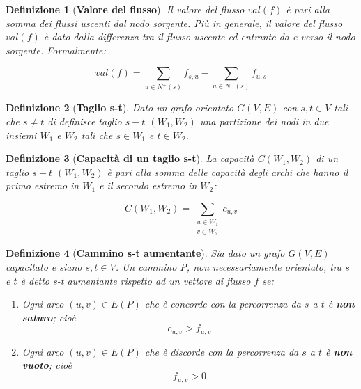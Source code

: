 \documentclass[10pt,a4paper,titlepage]{article}
\theoremstyle{break}
\newtheorem{myDef}{Definizione}
\theoremstyle{break}
\theoremstyle{break}
\begin{document}
\begin{myDef}[\textbf{Valore del flusso}]
Il valore del flusso $val(f)$ è pari alla \textit{somma dei flussi uscenti dal nodo sorgente}. Più in generale, il valore del flusso $val(f)$ è dato dalla differenza tra il flusso uscente ed entrante da e verso il nodo sorgente. Formalmente:

\begin{equation}
val(f) = \sum_{u \in N^+(s)} f_{s,u} - \sum_{u \in N^-(s)} f_{u,s}
\end{equation}

\end{myDef}

\begin{myDef}[\textbf{Taglio s-t}]
Dato un grafo orientato $G(V,E)$ con $s, t \in V$ tali che $s \neq t$ di definisce \textit{taglio $s-t$} $(W_1, W_2)$ una partizione dei nodi in due insiemi $W_1$ e $W_2$ tali che $s \in W_1$ e $t \in W_2$. 
\end{myDef}

\begin{myDef}[\textbf{Capacità di un taglio s-t}]
La \textit{capacità} $C(W_1, W_2)$ di un taglio $s-t$ $(W_1, W_2)$ è pari alla somma delle capacità degli archi che hanno il primo estremo in $W_1$ e il secondo estremo in $W_2$:

\begin{equation}
C(W_1, W_2) = \sum_{\begin{array}{ll} u \in W_1 \\ v \in W_2 \end{array}} c_{u,v}
\end{equation}

\end{myDef}

\begin{myDef}[\textbf{Cammino s-t aumentante}]

Sia dato un grafo $G(V,E)$ capacitato e siano $s, t \in V$. Un cammino P, non necessariamente orientato, tra $s$ e $t$ è detto \textit{s-t aumentante} rispetto ad un vettore di flusso $f$ se:

\begin{enumerate}
\item Ogni arco $(u, v) \in E(P)$ che è concorde con la percorrenza da $s$ a $t$ è \textbf{non saturo}; cioè
\begin{equation}
c_{u,v}>f_{u,v}
\end{equation}
\item Ogni arco $(u, v) \in E(P)$ che è discorde con la percorrenza da $s$ a $t$ è \textbf{non vuoto}; cioè
\begin{equation}
f_{u,v}>0
\end{equation}
\end{enumerate}

\end{myDef}
\end{document}
